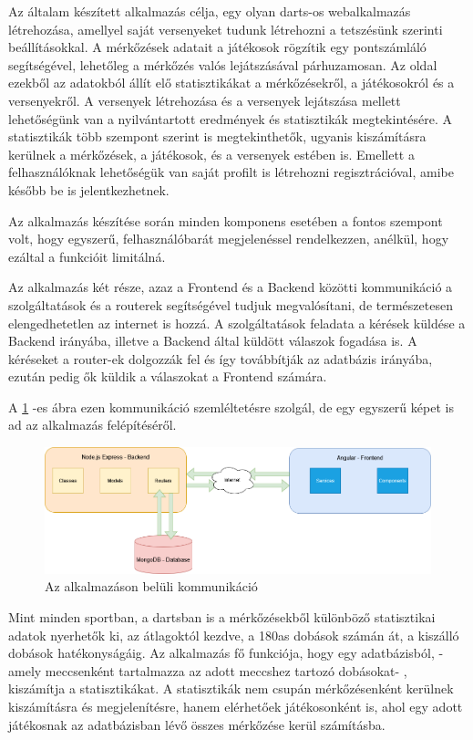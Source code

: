 
Az általam készített alkalmazás célja, egy olyan darts-os webalkalmazás létrehozása, amellyel saját versenyeket tudunk létrehozni a tetszésünk szerinti beállításokkal. A mérkőzések adatait a játékosok rögzítik egy pontszámláló segítségével, lehetőleg a mérkőzés valós lejátszásával párhuzamosan. Az oldal ezekből az adatokból állít elő statisztikákat a mérkőzésekről, a játékosokról és a versenyekről. A versenyek létrehozása és a versenyek lejátszása mellett lehetőségünk van a nyilvántartott eredmények és statisztikák megtekintésére. A statisztikák több szempont szerint is megtekinthetők, ugyanis kiszámításra kerülnek a mérkőzések, a játékosok, és a versenyek estében is. Emellett a felhasználóknak lehetőségük van saját profilt is létrehozni regisztrációval, amibe később be is jelentkezhetnek.

Az alkalmazás készítése során minden komponens esetében a fontos szempont volt, hogy egyszerű, felhasználóbarát megjelenéssel rendelkezzen, anélkül, hogy ezáltal a funkcióit limitálná.\newline

Az alkalmazás két része, azaz a Frontend és a Backend közötti kommunikáció a szolgáltatások és a routerek segítségével tudjuk megvalósítani, de természetesen elengedhetetlen az internet is hozzá. A szolgáltatások feladata a kérések küldése a Backend irányába, illetve a Backend által küldött válaszok fogadása is. A kéréseket a router-ek dolgozzák fel és így továbbítják az adatbázis irányába, ezután pedig ők küldik a válaszokat a Frontend számára.

A \ref{fig:network} -es ábra ezen kommunikáció szemléltetésre szolgál, de egy egyszerű képet is ad az alkalmazás felépítéséről.

\begin{figure}[h]
\centering
\includegraphics[scale=0.40]{images/DoubleOut_Network.drawio.png}
\caption{Az alkalmazáson belüli kommunikáció}
\label{fig:network}
\end{figure}

Mint minden sportban, a dartsban is a mérkőzésekből különböző statisztikai adatok nyerhetők ki, az átlagoktól kezdve, a 180as dobások számán át, a kiszálló dobások hatékonyságáig. Az alkalmazás fő funkciója, hogy egy adatbázisból, - amely meccsenként tartalmazza az adott meccshez tartozó dobásokat- , kiszámítja a statisztikákat. A statisztikák nem csupán mérkőzésenként kerülnek kiszámításra és megjelenítésre, hanem elérhetőek játékosonként is, ahol egy adott játékosnak az adatbázisban lévő összes mérkőzése kerül számításba.

